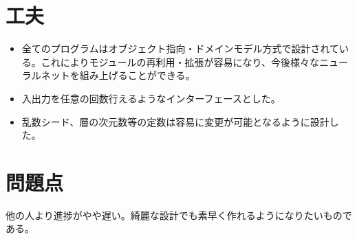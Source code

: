 \documentclass{ujarticle} %
\begin{document}
\section{工夫}
\begin{itemize}
  \item 全てのプログラムはオブジェクト指向・ドメインモデル方式で設計されている。これによりモジュールの再利用・拡張が容易になり、今後様々なニューラルネットを組み上げることができる。
  \item 入出力を任意の回数行えるようなインターフェースとした。
  \item 乱数シード、層の次元数等の定数は容易に変更が可能となるように設計した。
\end{itemize}

\section{問題点}
他の人より進捗がやや遅い。綺麗な設計でも素早く作れるようになりたいものである。
\end{document}
